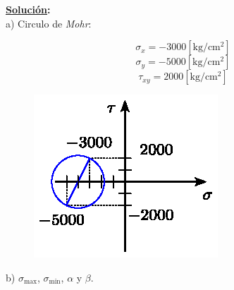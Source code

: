 \documentclass[letter,10pt,twoside]{article}
\begin{document}
\textbf{\underline{Solución}:} \\

a) Circulo de \emph{Mohr}:

\begin{equation*}
    \sigma_x = -3000[\text{kg}/\text{cm}^2]
\end{equation*}
\begin{equation*}
    \sigma_y = -5000[\text{kg}/\text{cm}^2]
\end{equation*}
\begin{equation*}
    \tau_{xy} = 2000[\text{kg}/\text{cm}^2]
\end{equation*}

\begin{figure}[H]
\centering
\includegraphics[scale=1.2]{resources/f31.eps}
\end{figure}

b) $\sigma_{\text{max}}$, $\sigma_{\text{min}}$, $\alpha$ y $\beta$.
\end{document}
